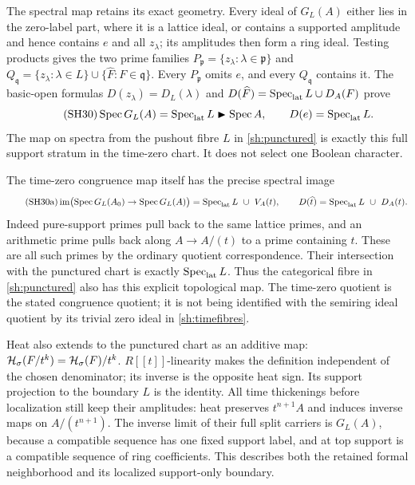 The spectral map retains its exact geometry. Every ideal of
$G_L(A)$ either lies in the zero-label part, where it is a
lattice ideal, or contains a supported amplitude and hence
contains $e$ and all $z_\lambda$; its amplitudes then form a
ring ideal. Testing products gives the two prime families
$P_{\mathfrak p}=\{z_\lambda:\lambda\in\mathfrak p\}$ and
$Q_{\mathfrak q}=\{z_\lambda:\lambda\in L\}
\cup\{\widehat F:F\in\mathfrak q\}$.
Every $P_{\mathfrak p}$ omits $e$, and every $Q_{\mathfrak q}$
contains it. The basic-open formulas
$D(z_\lambda)=D_L(\lambda)$ and
$D(\widehat F)=\operatorname{Spec}_{\rm lat}L\cup D_A(F)$ prove
\begin{equation}\tag{SH30}\label{sh:spectrum}
 \operatorname{Spec} G_L(A)=\operatorname{Spec}_{\rm lat}L\blacktriangleright\operatorname{Spec} A,\qquad
 D(e)=\operatorname{Spec}_{\rm lat}L.
\end{equation}
The map on spectra from the pushout fibre $L$ in
\eqref{sh:punctured} is exactly this full support stratum in
the time-zero chart. It does not select one Boolean character.

The time-zero congruence map itself has the precise spectral image
\begin{equation}\tag{SH30a}\label{sh:intersection}
 \operatorname{im}\bigl(\operatorname{Spec} G_L(A_0)\to\operatorname{Spec} G_L(A)\bigr)
   =\operatorname{Spec}_{\rm lat}L\ \cup\ V_A(t),\qquad
 D(\widehat t)=\operatorname{Spec}_{\rm lat}L\ \cup\ D_A(t).
\end{equation}
Indeed pure-support primes pull back to the same lattice primes,
and an arithmetic prime pulls back along $A\to A/(t)$ to a
prime containing $t$. These are all such primes by the ordinary
quotient correspondence. Their intersection with the punctured
chart is exactly $\operatorname{Spec}_{\rm lat}L$. Thus the categorical fibre
in \eqref{sh:punctured} also has this explicit topological map.
The time-zero quotient is the stated congruence quotient; it is
not being identified with the semiring ideal quotient by its
trivial zero ideal in \eqref{sh:timefibres}.

Heat also extends to the punctured chart as an additive map:
$\mathcal H_\sigma(F/t^k)=\mathcal H_\sigma(F)/t^k$.
$R[[t]]$-linearity makes the definition independent of the
chosen denominator; its inverse is the opposite heat sign.
Its support projection to the boundary $L$ is the identity.
All time thickenings before localization still keep their
amplitudes: heat preserves $t^{n+1}A$ and induces inverse maps
on $A/(t^{n+1})$. The inverse limit of their full split carriers
is $G_L(A)$, because a compatible sequence has one fixed
support label, and at top support is a compatible sequence
of ring coefficients. This describes both the retained formal
neighborhood and its localized support-only boundary.

